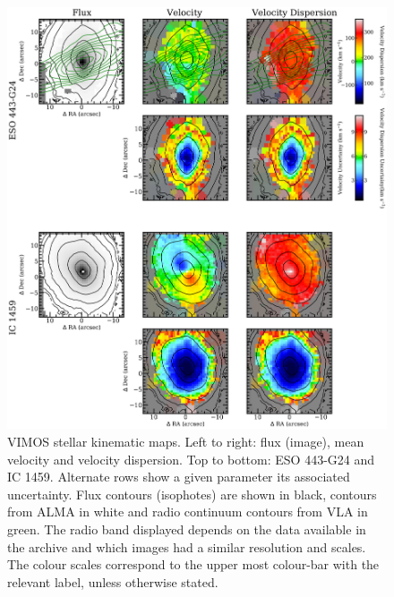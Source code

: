 		\begin{figure}
			\centering
			\includegraphics[height=0.62\textheight]{chapter4/vimos/kin1.png}
			\caption[VIMOS stellar kinematic maps]{VIMOS stellar kinematic maps. Left to right: flux (image), mean velocity and velocity dispersion. Top to bottom: ESO 443-G24 and IC 1459. Alternate rows show a given parameter its associated uncertainty. Flux contours (isophotes) are shown in black,  contours from ALMA in white and radio continuum contours from VLA in green. The radio band displayed depends on the data available in the archive and which images had a similar resolution and scales. The colour scales correspond to the upper most colour-bar with the relevant label, unless otherwise stated.}%
			\label{fig:VIMOS_stellar}
		\end{figure}
